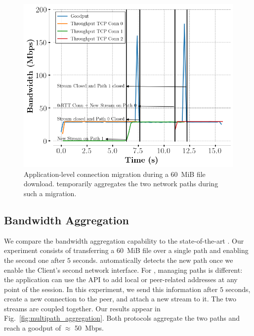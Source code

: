 \begin{figure}[!t]
  \begin{center}
    \includegraphics[width=\columnwidth]{figures/migration.png}
  \end{center}
  \caption{Application-level connection migration during a 60~MiB file download.
    \tcpls temporarily aggregates the two network paths during such a migration.}
  \label{fig:conn_migration}
\end{figure}

\subsection{Bandwidth Aggregation}
\label{sec:bwaggr}
We compare the \tcpls bandwidth aggregation capability to the state-of-the-art
\mptcp.
Our experiment consists of transferring a 60~MiB file over a single path
and enabling the second one after $5$ seconds. \mptcp automatically detects
the new path once we enable the Client's second network interface. For \tcpls,
managing paths is different: the application can use the API to add local or
peer-related addresses at any point of the session. In this experiment, we send
this information after $5$ seconds, create a new \tcp connection to the peer,
and attach a new stream to it. The two streams are coupled together. Our results
appear in Fig.~\ref{fig:multipath_aggregation}. Both protocols aggregate the
two paths and reach a goodput of $\approx$ 50~Mbps.

